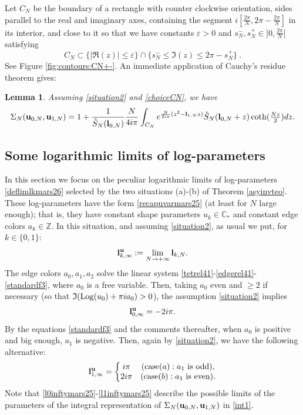 \documentclass[11pt]{amsart}
\newtheorem{lem}[teo]{Lemma}
\newcommand{\mc}{\mathbb{C}}
\newcommand{\mz}{\mathbb{Z}}
\newcommand{\bu}{{\bf u}}
\newcommand{\bl}{{\bf l}}
\newcommand{\Log}{{\rm Log}}
\newcommand{\ra}{\rightarrow}
\begin{document}
{Let $C_N$ be the boundary of a rectangle with counter clockwise orientation, sides parallel to the real and imaginary axes, containing the segment $\textstyle i[\frac{2\pi}{N},2\pi-\frac{2\pi}{N}]$ in its interior, and close to it so that we have constants $\varepsilon>0$ and $s_N^-,s_N^+\in ]0,\textstyle \frac{2\pi}{N}[$ satisfying  
\begin{equation}\label{choiceCN}
C_N \subset \{\vert \mathfrak{R}(z) \vert \leq \varepsilon\}\cap \{s_N^-\leq \mathfrak{I}(z) \leq 2\pi-s_N^+\}\ . \end{equation}
See Figure \ref{fig:contours:CN+-}. An immediate application of Cauchy's residue theorem gives:
\begin{lem}\label{lemintrep} Assuming \eqref{situation2} and \eqref{choiceCN}, we have
\begin{equation}\label{int1}
\Sigma_N(\bu_{0,N},\bu_{1,N}) =1+ \frac{1}{\hat S_N(\bl_{0,N})} \frac{N}{4i\pi}\int_{C_N} e^{\frac{N}{2i\pi}(z^2 - \bl_{1,N}z)}\hat S_N(\bl_{0,N} + z)\textstyle \coth(\frac{Nz}{2})dz.
\end{equation}
\end{lem}

\subsection{Some logarithmic limits of log-parameters}\label{loglimmars25} In this section we focus on the peculiar logarithmic limits of log-parameters \eqref{deflimlkmars26} selected by the two situations (a)-(b) of Theorem \ref{asyinvteo}. These log-parameters have the form \eqref{recapuvarmars25} (at least for $N$ large enough); that is, they have constant shape parameters $u_k\in \mc_*$ and constant edge colors $a_k\in\mz$. In this situation, and assuming \eqref{situation2}, as usual we put, for $k\in\{0,1\}$:
$$\bl_{k,\infty}^\bu := \lim_{N\ra +\infty} \bl_{k,N}.$$
The edge colors $a_0,a_1,a_2$ solve the linear system \eqref{tetrel41}-\eqref{edgerel41}-\eqref{standardf3}, where $a_0$ is a free variable. Then, taking $a_0$ even and $\geq 2$ if necessary (so that $\textstyle \mathfrak{I}(\Log(u_{0}) +\pi ia_{0})>0$), the assumption \eqref{situation2} implies
\begin{equation}\label{l0inftymars25}
\bl_{0,\infty}^\bu = -2i\pi.
\end{equation}
By the equations \eqref{standardf3} and the comments thereafter, when $a_0$ is positive and big enough, $a_1$ is negative. Then, again by \eqref{situation2}, we have the following alternative:
\begin{equation}\label{l1inftymars25}
\bl_{1,\infty}^\bu = \left \{\begin{matrix}
i\pi & \text{(case} (a): a_1 \ \text{is\ odd}),\\
2i\pi & \text{(case} (b): a_1 \ \text{is\ even}).
\end{matrix}
\right.
\end{equation}
Note that \eqref{l0inftymars25}-\eqref{l1inftymars25} describe the possible limits of the parameters of the integral representation of $\Sigma_N(\bu_{0,N},\bu_{1,N})$ in \eqref{int1}. 

}
\end{document}
